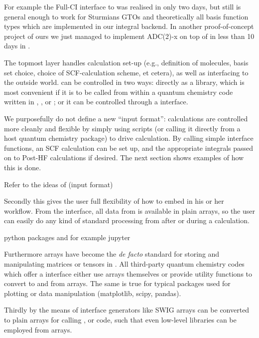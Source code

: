 For example the Full-CI interface to \pyscf was realised in only two days,
but still is general enough to work for Sturmians GTOs and theoretically
all basis function types which are implemented in our integral backend.
In another proof-of-concept project of ours we just managed to
implement ADC(2)-x on top of \molsturm in less than 10 days in \python.


The topmost \molsturm layer handles calculation set-up 
(e.g., definition of molecules, basis set choice, choice 
of SCF-calculation scheme, et cetera), as well as interfacing 
to the outside world. \molsturm can be controlled in two ways: 
directly as a \cpp library, which is most convenient if it is to 
be called from within a quantum chemistry code written in \cee, \cpp, 
or \fortran; or it can be controlled through a \python interface.

We purposefully do not define a new ``input format'': calculations are 
controlled more cleanly and flexible by simply using
\python scripts (or calling it directly from a host quantum 
chemistry package) to drive calculation.
By calling simple interface functions, an SCF calculation can be set
up, and the appropriate integrals passed on to Post-HF calculations
if desired. The next section shows examples of how this is done.

Refer to the ideas of \pyscf
(input format)

Secondly this gives the user full flexibility
of how to embed \molsturm in his or her workflow.
From the \python interface, all data from \molsturm is available
in plain \numpy arrays, so the user can easily do
any kind of standard processing from \python
after or during a calculation.

python packages and for example jupyter


Furthermore \numpy arrays have become the \textit{de facto} standard
for storing and manipulating matrices or tensors in \python.
All third-party quantum chemistry codes which
offer a \python interface
either use \numpy arrays themselves or
provide utility functions to convert to and
from \numpy arrays.
The same is true for typical \python packages used for plotting or
data manipulation (matplotlib, scipy, pandas).

Thirdly by the means of interface generators
like SWIG  \numpy arrays can be converted to plain
\cee arrays for calling \cpp, \cee or \fortran code,
such that even low-level libraries can be employed
from \numpy arrays.



